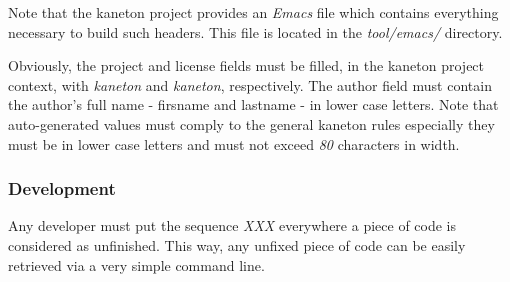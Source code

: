 Note that the kaneton project provides an \textit{Emacs} file which contains
everything necessary to build such headers. This file is located in the
\textit{tool/emacs/} directory.

Obviously, the project and license fields must be filled, in the kaneton
project context, with \textit{kaneton} and \textit{kaneton}, respectively. The
author field must contain the author's full name - firsname and lastname -
in lower case letters. Note that auto-generated values must comply to
the general kaneton rules especially they must be in lower case letters and
must not exceed \textit{80} characters in width.


\subsubsection{Development}

Any developer must put the sequence \textit{XXX} everywhere a piece of code
is considered as unfinished. This way, any unfixed piece of code can be
easily retrieved via a very simple command line.
